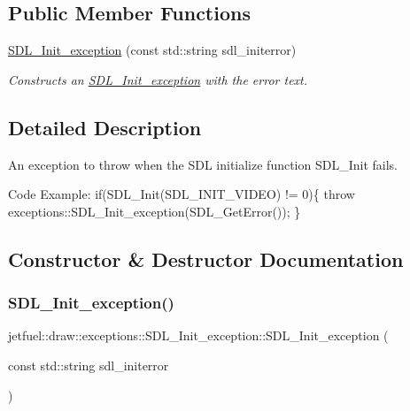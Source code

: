 \subsection*{Public Member Functions}
\begin{DoxyCompactItemize}
\item 
\hyperlink{classjetfuel_1_1draw_1_1exceptions_1_1SDL__Init__exception_a7af9e4d40d575a1bec7b79407e2f7cce}{S\+D\+L\+\_\+\+Init\+\_\+exception} (const std\+::string sdl\+\_\+initerror)
\begin{DoxyCompactList}\small\item\em Constructs an \hyperlink{classjetfuel_1_1draw_1_1exceptions_1_1SDL__Init__exception}{S\+D\+L\+\_\+\+Init\+\_\+exception} with the error text. \end{DoxyCompactList}\end{DoxyCompactItemize}


\subsection{Detailed Description}
An exception to throw when the S\+DL initialize function S\+D\+L\+\_\+\+Init fails.

Code Example\+: if(S\+D\+L\+\_\+\+Init(\+S\+D\+L\+\_\+\+I\+N\+I\+T\+\_\+\+V\+I\+D\+E\+O) != 0)\{ throw exceptions\+::\+S\+D\+L\+\_\+\+Init\+\_\+exception(\+S\+D\+L\+\_\+\+Get\+Error()); \} 

\subsection{Constructor \& Destructor Documentation}
\mbox{\label{classjetfuel_1_1draw_1_1exceptions_1_1SDL__Init__exception_a7af9e4d40d575a1bec7b79407e2f7cce}} 
\subsubsection{\texorpdfstring{S\+D\+L\+\_\+\+Init\+\_\+exception()}{SDL\_Init\_exception()}}
{\footnotesize\ttfamily jetfuel\+::draw\+::exceptions\+::\+S\+D\+L\+\_\+\+Init\+\_\+exception\+::\+S\+D\+L\+\_\+\+Init\+\_\+exception (\begin{DoxyParamCaption}\item[{const std\+::string}]{sdl\+\_\+initerror }\end{DoxyParamCaption})\hspace{0.3cm}{\ttfamily [inline]}}



